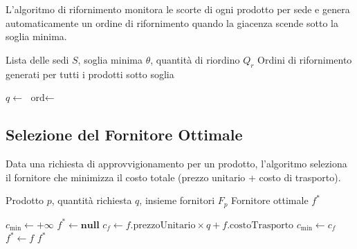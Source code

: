 \documentclass[12pt, a4paper, twoside, openright]{article}
\begin{document}
L'algoritmo di rifornimento monitora le scorte di ogni prodotto per sede e genera
automaticamente un ordine di rifornimento quando la giacenza scende sotto la soglia minima.

\begin{algorithm}[H]
\caption{Rifornimento Automatico Inventario}
\label{alg:rifornimento}
\begin{algorithmic}[1]
\Require Lista delle sedi $S$, soglia minima $\theta$, quantità di riordino $Q_r$
\Ensure Ordini di rifornimento generati per tutti i prodotti sotto soglia

 
        \State $q \gets$ 
            \State $\text{ord} \gets$ 
            \State {}
            \State {}
        \EndIf
    \EndFor
\EndFor
\end{algorithmic}
\end{algorithm}

\subsection{Selezione del Fornitore Ottimale}

Data una richiesta di approvvigionamento per un prodotto, l'algoritmo seleziona il fornitore
che minimizza il costo totale (prezzo unitario + costo di trasporto).

\begin{algorithm}[H]
\caption{Selezione Fornitore a Costo Minimo}
\label{alg:fornitore}
\begin{algorithmic}[1]
\Require Prodotto $p$, quantità richiesta $q$, insieme fornitori $F_p$
\Ensure Fornitore ottimale $f^*$

\State $c_{\min} \gets +\infty$
\State $f^* \gets \textbf{null}$
    \State $c_f \gets f.\text{prezzoUnitario} \times q + f.\text{costoTrasporto}$
        \State $c_{\min} \gets c_f$
        \State $f^* \gets f$
    \EndIf
\EndFor
\State \Return $f^*$
\end{algorithmic}
\end{algorithm}

\end{document}
